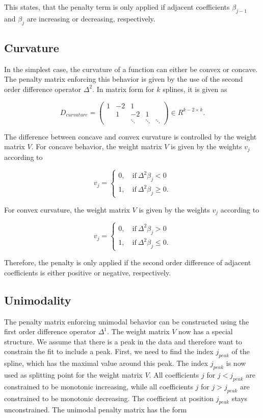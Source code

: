 \documentclass[10pt,a4paper]{article}
\begin{document}
	This states, that the penalty term is only applied if adjacent coefficients $\beta_{j-1}$ and $\beta_j$ are increasing or decreasing, respectively. \cite{hofner2011monotonicity} \cite{eilers2005unimodal}
	
	\subsection{Curvature}
	
	In the simplest case, the curvature of a function can either be convex or concave. The penalty matrix  enforcing this behavior is given by the use of the second order difference operator $\Delta^2$. In matrix form for $k$ splines, it is given as
	
	$$D_{curvature} = \begin{pmatrix} 1 & -2 & 1 \\ & 1 &-2 &1 \\ & & \ddots & \ddots & \ddots  \end{pmatrix} \in R^{k-2 \times k}.$$
	
	The difference between concave and convex curvature is controlled by the weight matrix $V$. For concave behavior, the weight matrix $V$ is given by the weights $v_j$ according to
	
	$$v_j = \begin{cases} 0, \quad \text{if} \ \Delta^2\beta_j < 0 \\ 1, \quad \text{if} \ \Delta^2\beta_j \ge 0. \end{cases}$$
	
	For convex curvature, the weight matrix $V$ is given by the weights $v_j$ according to
	
	$$v_j = \begin{cases} 0, \quad \text{if} \ \Delta^2\beta_j > 0 \\ 1, \quad \text{if} \ \Delta^2\beta_j \le 0. \end{cases}$$
	
	Therefore, the penalty is only applied if the second order difference of adjacent coefficients is either positive or negative, respectively. \cite{eilers2005unimodal}
	
	\subsection{Unimodality}
	
	The penalty matrix enforcing unimodal behavior can be constructed using the first order difference operator $\Delta^1$. The weight matrix $V$ now has a special structure. We assume that there is a peak in the data and therefore want to constrain the fit to include a peak. First, we need to find the index $j_{peak}$ of the spline, which has the maximal value around this  peak. The index $j_{peak}$ is now used as splitting point for the weight matrix $V$. All coefficients $j$ for $j < j_{peak}$ are constrained to be monotonic increasing, while all coefficients $j$ for $j > j_{peak}$ are constrained to be monotonic decreasing. The coefficient at position $j_{peak}$ stays unconstrained. \cite{eilers2005unimodal} The unimodal penalty matrix has the form 
	
\end{document}

